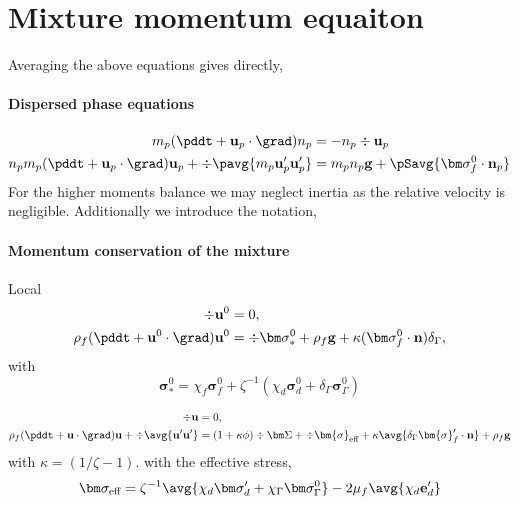 
\section{Mixture momentum equaiton}

Averaging the above equations gives directly, 
\paragraph{Dispersed phase equations}
\begin{align}
    m_p (\pddt + \textbf{u}_p \cdot \grad )n_p &= - n_p \div \textbf{u}_p\\
    n_p m_p (\pddt + \textbf{u}_p\cdot  \grad) \textbf{u}_p
    + \div \pavg{ m_p \textbf{u}_p' \textbf{u}_p'}
    &= 
    m_p n_p \textbf{g}
    + \pSavg{\bm\sigma_f^0 \cdot \textbf{n}_p}
\end{align}
For the higher moments balance we may neglect inertia as the relative velocity is negligible. 
Additionally we introduce the notation,

\paragraph{Momentum conservation of the mixture}

Local
\begin{align}
     \div \textbf{u}^0 &= 0, \\
    \rho_f(\pddt 
    + \textbf{u}^0 \cdot \grad) \textbf{u}^0
    &= 
    \div \bm\sigma_*^0
    +\rho_f \textbf{g}
    +\kappa(\bm\sigma_f^0\cdot \textbf{n})\delta_\Gamma,
\end{align}
with 
\begin{equation}
    \bm\sigma_*^0 = 
    \chi_f \bm\sigma_f^0
    + \zeta^{-1}(\chi_d \bm\sigma_d^0
    + \delta_\Gamma \bm\sigma_\Gamma^0)
\end{equation}

\begin{align}
    \label{eq:NS_not_dispersed_mass}
    \div\textbf{u}&=0, \\
    \rho_f (\pddt 
    + \textbf{u}\cdot \grad)
    \textbf{u}
    +\div\avg{\textbf{u}'\textbf{u}'}
    &= 
    (1 +\kappa\phi)\div \bm\Sigma
    +\div  \bm{\sigma}_\text{eff} 
    + \kappa \avg{\delta_\Gamma \bm{\sigma}_f' \cdot \textbf{n}} 
    + \rho_f \textbf{g} 
    \label{eq:NS_not_dispersed}
\end{align}
with $\kappa = (1/\zeta - 1)$. 
with the effective stress, 
\begin{equation}
    \bm\sigma_\text{eff}  = 
    \zeta^{-1} \avg{\chi_d  \bm\sigma_d' + \chi_\Gamma  \bm\sigma_\Gamma^0}
    -  2\mu_f\avg{\chi_d  \textbf{e}_d'}
\end{equation}

